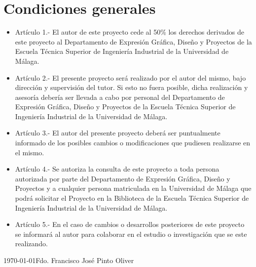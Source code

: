 \chapter{Condiciones generales}
\begin{itemize}
\item Artículo 1.- El autor de este proyecto cede al 50\% los derechos derivados de este proyecto al Departamento de Expresión Gráfica, Diseño y Proyectos de la Escuela Técnica Superior de Ingeniería Industrial de la Universidad de Málaga.

\item Artículo 2.- El presente proyecto será realizado por el autor del mismo, bajo dirección y supervisión del tutor. Si esto no fuera posible, dicha realización y asesoría debería ser llevada a cabo por personal del Departamento de Expresión Gráfica, Diseño y Proyectos de la Escuela Técnica Superior de Ingeniería Industrial de la Universidad de Málaga.

\item Artículo 3.- El autor del presente proyecto deberá ser puntualmente informado de los posibles cambios o modificaciones que pudiesen realizarse en el mismo.

\item Artículo 4.- Se autoriza la consulta de este proyecto a toda persona autorizada por parte del Departamento de Expresión Gráfica, Diseño y Proyectos y a cualquier persona matriculada en la Universidad de Málaga que podrá solicitar el Proyecto en la Biblioteca de la Escuela Técnica Superior de Ingeniería Industrial de la Universidad de Málaga.

\item Artículo 5.- En el caso de cambios o desarrollos posteriores de este proyecto se informará al autor para colaborar en el estudio o investigación que se este realizando.
\end{itemize}

\today \hfill Fdo. Francisco José Pinto Oliver


